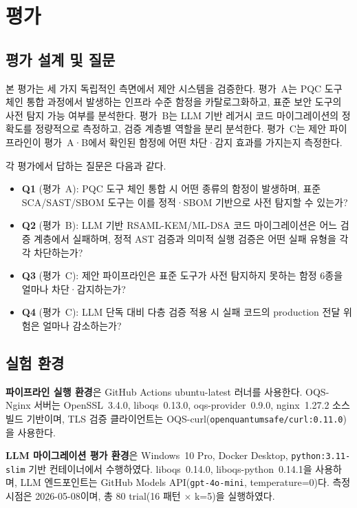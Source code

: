 \section{평가}

\subsection{평가 설계 및 질문}

본 평가는 세 가지 독립적인 측면에서 제안 시스템을 검증한다.
평가~A는 PQC 도구 체인 통합 과정에서 발생하는 인프라 수준 함정을 카탈로그화하고, 표준 보안 도구의 사전 탐지 가능 여부를 분석한다.
평가~B는 LLM 기반 레거시 코드 마이그레이션의 정확도를 정량적으로 측정하고, 검증 계층별 역할을 분리 분석한다.
평가~C는 제안 파이프라인이 평가~A·B에서 확인된 함정에 어떤 차단·감지 효과를 가지는지 측정한다.

각 평가에서 답하는 질문은 다음과 같다.

\begin{itemize}
  \item \textbf{Q1} (평가~A): PQC 도구 체인 통합 시 어떤 종류의 함정이 발생하며, 표준 SCA/SAST/SBOM 도구는 이를 정적·SBOM 기반으로 사전 탐지할 수 있는가?
  \item \textbf{Q2} (평가~B): LLM 기반 RSA\textrightarrow ML-KEM/ML-DSA 코드 마이그레이션은 어느 검증 계층에서 실패하며, 정적 AST 검증과 의미적 실행 검증은 어떤 실패 유형을 각각 차단하는가?
  \item \textbf{Q3} (평가~C): 제안 파이프라인은 표준 도구가 사전 탐지하지 못하는 함정 6종을 얼마나 차단·감지하는가?
  \item \textbf{Q4} (평가~C): LLM 단독 대비 다층 검증 적용 시 실패 코드의 production 전달 위험은 얼마나 감소하는가?
\end{itemize}

\subsection{실험 환경}

\textbf{파이프라인 실행 환경}은 GitHub Actions ubuntu-latest 러너를 사용한다.
OQS-Nginx 서버는 OpenSSL~3.4.0, liboqs~0.13.0, oqs-provider~0.9.0, nginx~1.27.2 소스 빌드 기반이며, TLS 검증 클라이언트는 OQS-curl(\texttt{openquantumsafe/curl:0.11.0})을 사용한다.

\textbf{LLM 마이그레이션 평가 환경}은 Windows~10 Pro, Docker Desktop, \texttt{python:3.11-slim} 기반 컨테이너에서 수행하였다.
liboqs~0.14.0, liboqs-python~0.14.1을 사용하며, LLM 엔드포인트는 GitHub Models API(\texttt{gpt-4o-mini}, temperature=0)다.
측정 시점은 2026-05-08이며, 총 80 trial(16 패턴 $\times$ k=5)을 실행하였다.

